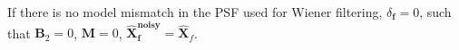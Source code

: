 If there is no model mismatch in the PSF used for Wiener filtering, \ie $\delta_{\bm{f}} = 0$, such that $\bm{B}_2 = 0$, $\bm{M} = 0$, $ \bm{\bm{\hat{X}}_f^{\text{noisy}}} = \bm{\hat{X}}_f $.








